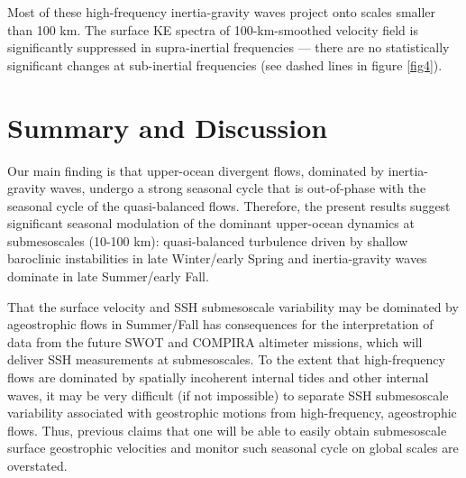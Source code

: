 \documentclass[grl]{agutex2015}
\begin{document}
\begin{article}
Most of these high-frequency inertia-gravity waves project onto scales smaller
than 100 km. The surface KE spectra of 100-km-smoothed velocity field is significantly
suppressed in supra-inertial frequencies --- there are no statistically significant
changes at sub-inertial frequencies (see dashed lines in figure \ref{fig4}).





\section{Summary and Discussion}
Our main finding is that
upper-ocean divergent flows, dominated by inertia-gravity waves, undergo
a strong seasonal cycle that is out-of-phase with the seasonal cycle of
the quasi-balanced flows. Therefore, the present results suggest significant
seasonal modulation of the dominant upper-ocean dynamics at submesoscales
(10-100 km): quasi-balanced turbulence driven by shallow baroclinic instabilities
in late Winter/early Spring
and inertia-gravity waves dominate in late Summer/early Fall.

That the  surface velocity and SSH submesoscale variability may be
dominated by ageostrophic flows in
Summer/Fall has consequences for the interpretation of data from
the future SWOT and COMPIRA altimeter missions,
which will deliver SSH measurements at submesoscales. To the extent that
high-frequency flows are dominated by spatially incoherent internal tides and other
internal waves, it may be very difficult (if not impossible) to
separate SSH submesoscale variability associated with geostrophic motions
from high-frequency, ageostrophic flows. Thus, previous claims that
one will be able to easily obtain submesoscale surface
geostrophic velocities and monitor such seasonal cycle on global scales
\citep{sasaki_etal2014,qiu_etal2014} are overstated.


\end{article}
\end{document}
